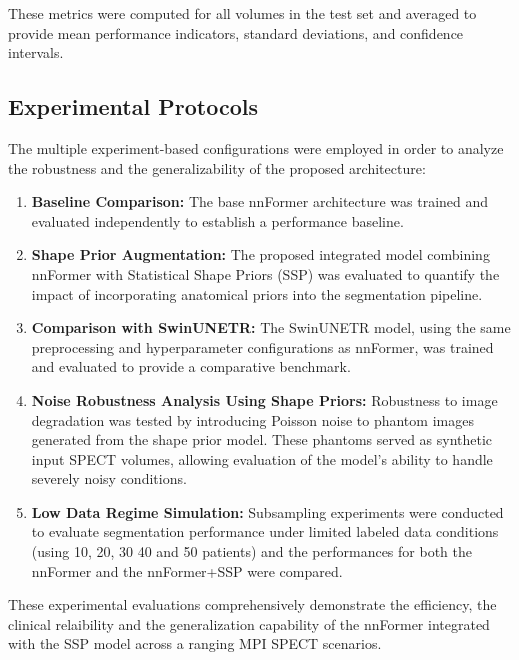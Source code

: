 These metrics were computed for all volumes in the test set and averaged to provide mean performance indicators, standard deviations, and confidence intervals.

\subsection{Experimental Protocols}

The multiple experiment-based configurations were employed in order to analyze the robustness and the generalizability of the proposed architecture:

\begin{enumerate}
    \item \textbf{Baseline Comparison:} The base nnFormer architecture was trained and evaluated independently to establish a performance baseline.
    
    \item \textbf{Shape Prior Augmentation:} The proposed integrated model combining nnFormer with Statistical Shape Priors (SSP) was evaluated to quantify the impact of incorporating anatomical priors into the segmentation pipeline.
    
    \item \textbf{Comparison with SwinUNETR:} The SwinUNETR model, using the same preprocessing and hyperparameter configurations as nnFormer, was trained and evaluated to provide a comparative benchmark.
    
    \item \textbf{Noise Robustness Analysis Using Shape Priors:} Robustness to image degradation was tested by introducing Poisson noise to phantom images generated from the shape prior model. These phantoms served as synthetic input SPECT volumes, allowing evaluation of the model's ability to handle severely noisy conditions.

    \item \textbf{Low Data Regime Simulation:} Subsampling experiments were conducted to evaluate segmentation performance under limited labeled data conditions (using 10, 20, 30 40 and 50 patients) and the performances for both the nnFormer and the nnFormer+SSP were compared.

\end{enumerate}

These experimental evaluations comprehensively demonstrate the efficiency, the clinical relaibility and the generalization capability of the nnFormer integrated with the SSP model across a ranging MPI SPECT scenarios.

